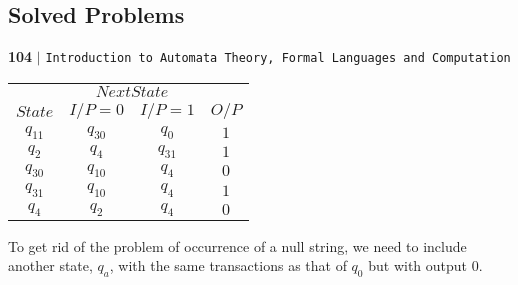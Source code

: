 \documentclass[8pt]{beamer}
\begin{document}
\begin{frame}
\section*{Solved Problems}
\begin{flushleft}
    \textbf{104}\hspace*{0.1cm} \textbf{$|$} \hspace*{0.1cm} \texttt{Introduction to Automata Theory, Formal Languages and Computation}
  \end{flushleft}
  \vspace*{1cm}
  
  \begin{center}
\begin{tabular}{cccc}
 \hline

 \hline

 \hline

 \hline
 & \multicolumn{2}{c}{$Next State$ }\\
 \cline{2-3}
 $State$ &  $I/P=0$ & $I/P=1$  &  $O/P$\\
\hline
$q_11$   &    $q_30$   &  $q_0$    &  $1$ \\
$q_2$    &    $q_4$    &  $q_31$   &  $1$ \\
$q_30$   &    $q_10$   &  $q_4$    &  $0$ \\
$q_31$   &    $q_10$   &  $q_4$    &  $1$ \\
$q_4$    &    $q_2$    &  $q_4$    &  $0$ \\ 
 \hline

 \hline

 \hline

 \hline
\end{tabular}
\end{center}

\vspace*{0.3cm}
To get rid of the problem of occurrence of a null string, we need to include another state, $q_a$, with
the same transactions as that of $q_0$ but with output 0.\\
\end{frame}
\end{document}
